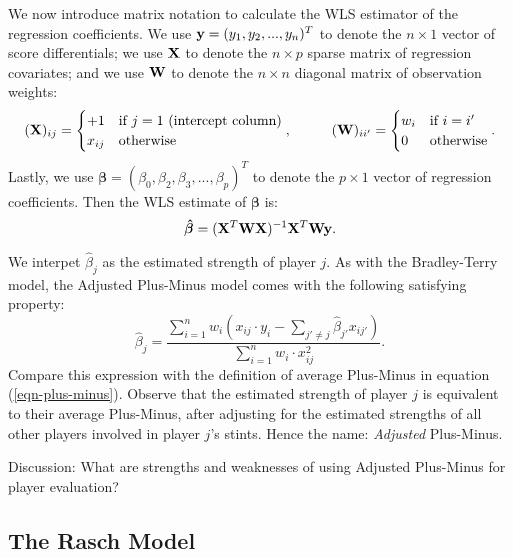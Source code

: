 \documentclass{article}
\begin{document}
  We now introduce matrix notation to calculate the WLS estimator of the regression coefficients. We use ${\bf y} = (y_1, y_2, ..., y_n)^T$ to denote the $n \times 1$ vector of score differentials; we use $\bf X$ to denote the $n \times p$ sparse matrix of regression covariates; and we use $\bf W$ to denote the $n \times n$ diagonal matrix of observation weights:
  \begin{equation*}
    ({\bf X})_{ij} = \begin{cases}
      +1 & \mbox{if $j = 1$ (intercept column)}\\
      x_{ij} & \mbox{otherwise}
    \end{cases},
    \hspace{1cm}
    ({\bf W})_{ii'} = \begin{cases}
      w_i & \mbox{if $i = i'$}\\
      0 & \mbox{otherwise}
    \end{cases}.
  \end{equation*}
  Lastly, we use $\boldsymbol{\beta} = (\beta_0, \beta_2, \beta_3, ..., \beta_p)^T$ to denote the $p \times 1$ vector of regression coefficients. Then the WLS estimate of $\boldsymbol{\beta}$ is:
  \begin{equation*}
    \boldsymbol{\hat\beta} = ({\bf X}^T {\bf W} {\bf X})^{-1} {\bf X}^T {\bf W} {\bf y}.
  \end{equation*}

  We interpet $\hat\beta_j$ as the estimated strength of player $j$. As with the Bradley-Terry model, the Adjusted Plus-Minus model comes with the following satisfying property:
  \begin{equation*}
    \hat\beta_j = \frac{
      \sum_{i = 1}^n w_i \left(x_{ij} \cdot y_i - \sum_{j' \neq j} \hat\beta_{j'}x_{ij'} \right)
    }{
      \sum_{i = 1}^n w_i \cdot x_{ij}^2
    }.
  \end{equation*}
  Compare this expression with the definition of average Plus-Minus in equation (\ref{eqn-plus-minus}). Observe that the estimated strength of player $j$ is equivalent to their average Plus-Minus, after adjusting for the estimated strengths of all other players involved in player $j$'s stints. Hence the name: {\it Adjusted} Plus-Minus.

  \begin{framed}
    {\sc Discussion:} What are strengths and weaknesses of using Adjusted Plus-Minus for player evaluation?
  \end{framed}

  \subsection{\sc The Rasch Model}
\end{document}
